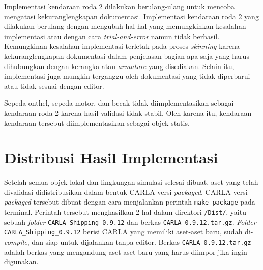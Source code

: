 Implementasi kendaraan roda 2 dilakukan berulang-ulang untuk mencoba mengatasi
kekuranglengkapan dokumentasi. Implementasi kendaraan roda 2 yang dilakukan
berulang dengan mengubah hal-hal yang memungkinkan kesalahan implementasi atau
dengan cara \textit{trial-and-error} namun tidak berhasil. Kemungkinan kesalahan
implementasi terletak pada proses \textit{skinning} karena kekuranglengkapan
dokumentasi dalam penjelasan bagian apa saja yang harus dihubungkan dengan
kerangka atau \textit{armature} yang disediakan. Selain itu, implementasi juga
mungkin terganggu oleh dokumentasi yang tidak diperbarui atau tidak sesuai
dengan editor.


Sepeda onthel, sepeda motor, dan becak tidak diimplementasikan sebagai kendaraan
roda 2 karena hasil validasi tidak stabil. Oleh karena itu, kendaraan-kendaraan
tersebut diimplementasikan sebagai objek statis.

\section{Distribusi Hasil Implementasi}

Setelah semua objek lokal dan lingkungan simulasi selesai dibuat, aset yang
telah divalidasi didistribusikan dalam bentuk CARLA versi \textit{packaged}.
CARLA versi \textit{packaged} tersebut dibuat dengan cara menjalankan perintah
\verb|make package| pada terminal. Perintah tersebut menghasilkan 2 hal dalam
direktori \verb|/Dist/|, yaitu sebuah \textit{folder}
\verb|CARLA_Shipping_0.9.12| dan berkas \verb|CARLA_0.9.12.tar.gz|.
\textit{Folder} \verb|CARLA_Shipping_0.9.12| berisi CARLA yang memiliki
aset-aset baru, sudah di-\textit{compile}, dan siap untuk dijalankan tanpa
editor. Berkas \verb|CARLA_0.9.12.tar.gz| adalah berkas yang mengandung
aset-aset baru yang harus diimpor jika ingin digunakan.
